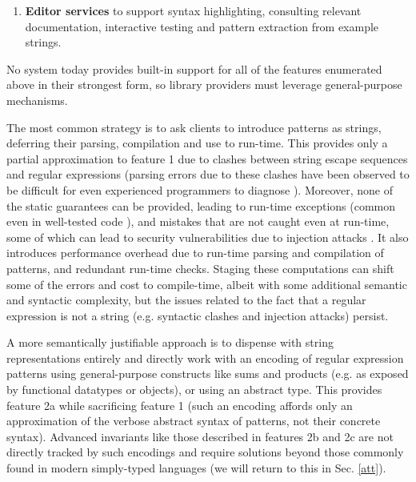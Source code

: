 \begin{enumerate}
\item \textbf{Editor services} to support syntax highlighting, consulting relevant documentation, interactive testing and pattern extraction from example strings.
\end{enumerate}

No system today provides built-in support for all of the features enumerated above in their strongest form, so library providers must leverage  general-purpose mechanisms. %

The most common strategy is to ask clients to introduce patterns as strings, deferring their  parsing, compilation and use to run-time. This provides only a partial approximation to feature 1 due to clashes between string escape sequences and regular expressions (parsing errors due to these clashes have been observed to be difficult for even experienced programmers to diagnose \cite{Omar:2012:ACC:2337223.2337324}). Moreover, none of the static guarantees can be provided, leading to run-time exceptions (common even in well-tested code \cite{spishak2012type}), and mistakes that are not caught even at run-time, some of which can lead to security vulnerabilities due to injection attacks \cite{owasp2013}. It also introduces performance overhead due to run-time parsing and compilation of patterns, and redundant run-time checks.  Staging these computations can shift some of the errors and cost to compile-time, albeit with some additional semantic and syntactic complexity, but the issues related to the fact that a regular expression is not a string (e.g. syntactic clashes and injection attacks) persist.%

A more semantically justifiable approach is to dispense with string representations entirely and directly work with an encoding of regular expression patterns using  general-purpose constructs like sums and  products (e.g. as exposed by functional datatypes or objects), or using an abstract type. This provides feature 2a while sacrificing feature 1 (such an encoding affords only an approximation of the verbose abstract syntax of patterns, not their concrete syntax). Advanced invariants like those described in features 2b and 2c are not directly tracked by such encodings and require solutions beyond those commonly found in modern simply-typed languages (we will return to this  in Sec. \ref{att}).%

